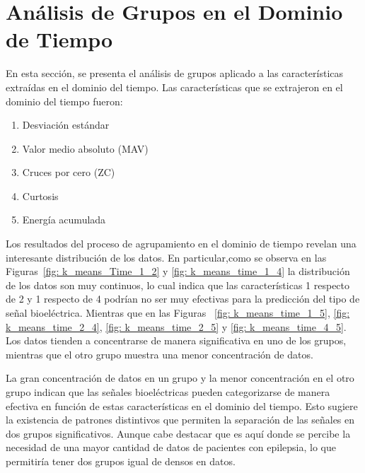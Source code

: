 \section{Análisis de Grupos en el Dominio de Tiempo}
En esta sección, se presenta el análisis de grupos aplicado a las características extraídas en el dominio del tiempo. 
Las características que se extrajeron en el dominio del tiempo fueron:
\begin{enumerate}
    \item Desviación estándar
    \item Valor medio absoluto (MAV)
    \item Cruces por cero (ZC)
    \item Curtosis
    \item Energía acumulada
\end{enumerate}

Los resultados del proceso de agrupamiento en el dominio de tiempo revelan una interesante distribución de los datos. En particular,como se observa en las Figuras~\ref{fig: k_means_Time_1_2} y \ref{fig: k_means_time_1_4} la distribución de los datos son muy continuos, lo cual indica que las características 1 respecto de 2 y 1 respecto de 4 podrían no ser muy efectivas para la predicción del tipo de señal bioeléctrica. Mientras que en las Figuras ~\ref{fig: k_means_time_1_5}, \ref{fig: k_means_time_2_4}, \ref{fig: k_means_time_2_5} y \ref{fig: k_means_time_4_5}. Los datos tienden a concentrarse de manera significativa en uno de los grupos, mientras que el otro grupo muestra una menor concentración de datos. 

La gran concentración de datos en un grupo y la menor concentración en el otro grupo indican que las señales bioeléctricas pueden categorizarse de manera efectiva en función de estas características en el dominio del tiempo. Esto sugiere la existencia de patrones distintivos que permiten la separación de las señales en dos grupos significativos. Aunque cabe destacar que es aquí donde se percibe la necesidad de una mayor cantidad de datos de pacientes con epilepsia, lo que permitiría tener dos grupos igual de densos en datos. 

